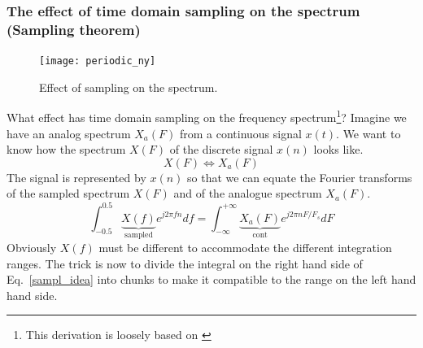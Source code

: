 \documentclass[12pt,a4paper]{article}
\begin{document}
\subsubsection{The effect of time domain sampling on the spectrum (Sampling
theorem)}
\begin{figure}[!hbt]
\begin{center}
\mbox{\texttt{[image: periodic\_ny]}}
\end{center}
\caption{Effect of sampling on the spectrum.
\label{periodic_ny}}
\end{figure}
What effect has time domain sampling on the frequency spectrum\footnote{This derivation is loosely based on \citet{Proakis1996}}? Imagine we
have an analog spectrum $X_a(F)$ from a continuous signal $x(t)$. We want
to know how the spectrum $X(F)$ of the discrete signal $x(n)$ looks like.
\begin{equation}
X(F) \Leftrightarrow X_a(F)
\end{equation}
The signal is represented by $x(n)$ so that
we can equate the Fourier transforms of the sampled spectrum $X(F)$ and
of the analogue spectrum $X_a(F)$. 
\begin{equation}
\int_{-0.5}^{0.5} \underbrace{X(f)}_{\mbox{sampled}} e^{j 2 \pi f n} df = 
\int_{-\infty}^{+\infty} \underbrace{X_a(F)}_{\mbox{cont}} e^{j 2\pi n F/F_s} dF
\label{sampl_idea}
\end{equation}
Obviously $X(f)$ must be different to accommodate the different integration
ranges. The trick is now to divide the integral on the right hand side 
of Eq.~\ref{sampl_idea} 
into chunks to make it compatible to the range on the left hand
hand side.
\end{document}
